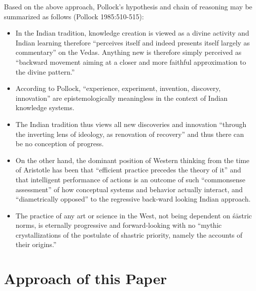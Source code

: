 Based on the above approach, Pollock's hypothesis and chain of reasoning may be summarized as follows (Pollock 1985:510-515): 
\begin{itemize}
\item In the Indian tradition, knowledge creation is viewed as a divine activity and Indian learning therefore ``perceives itself and indeed presents itself largely as commentary'' on the Vedas. Anything new is therefore simply perceived as ``backward movement aiming at a closer and more faithful approximation to the divine pattern.''

\item According to Pollock, ``experience, experiment, invention, discovery, innovation'' are epistemologically meaningless in the context of Indian knowledge systems.

\item The Indian tradition thus views all new discoveries and innovation ``through the inverting lens of ideology, as renovation of recovery'' and thus there can be no conception of progress.

\item On the other hand, the dominant position of Western thinking from the time of Aristotle has been that ``efficient practice precedes the theory of it'' and that intelligent performance of actions is an outcome of such ``commonsense assessment'' of how conceptual systems and behavior actually interact, and ``diametrically opposed'' to the regressive back-ward looking Indian approach. 

\item The practice of any art or science in the West, not being dependent on śāstric norms, is eternally progressive and forward-looking with no ``mythic crystallizations of the postulate of shastric priority, namely the accounts of their origins.''
\end{itemize}

\section*{Approach of this Paper}

